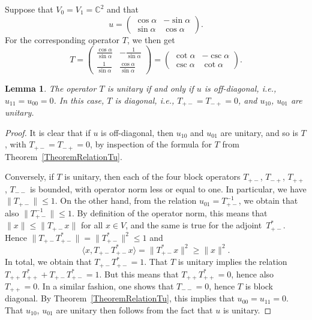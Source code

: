 \documentclass[10pt,a4paper]{amsart}
\numberwithin{equation}{section}
\newtheorem{Lemma}[Theorem]{Lemma}
\newcommand{\C}{\mathbb{C}}
\begin{document}
\begin{Example}
Suppose that $V_0 = V_1 = \C^2$ and that
\begin{equation*}
 u = \begin{pmatrix} \cos\alpha & - \sin\alpha \\ \sin\alpha & \cos\alpha \end{pmatrix}.
\end{equation*}
For the corresponding operator $T$, we then get
\begin{equation*}
 T = \begin{pmatrix} \frac{\cos\alpha}{\sin\alpha} & - \frac{1}{\sin\alpha} \\ \frac{1}{\sin\alpha} & \frac{\cos\alpha}{\sin\alpha} \end{pmatrix} = \begin{pmatrix} \cot\alpha & - \csc\alpha \\ \csc\alpha & \cot\alpha \end{pmatrix}.
\end{equation*}
\end{Example}

\begin{Lemma} \label{LemmaTunitary}
The operator $T$ is unitary if and only if $u$ is off-diagonal, i.e., $u_{11} = u_{00} = 0$.
In this case, $T$ is diagonal, i.e., $T_{+-} = T_{-+} = 0$, and $u_{10}$, $u_{01}$ are unitary.
\end{Lemma}

\begin{proof}
It is clear that if $u$ is off-diagonal, then $u_{10}$ and $u_{01}$ are unitary, and so is $T$, with $T_{+-} = T_{-+}=0$, by inspection of the formula for $T$ from Theorem~\ref{TheoremRelationTu}.

Conversely, if $T$ is unitary, then each of the four block operators $T_{+-}$, $T_{-+}$, $T_{++}$, $T_{--}$ is bounded, with operator norm less or equal to one.
In particular, we have $\|T_{+-}\| \leq 1$.
On the other hand, from the relation $u_{01} = T_{+-}^{-1}$, we obtain that also $\big\|T_{+-}^{-1}\big\| \leq 1$.
By definition of the operator norm, this means that $\|x\| \leq \|T_{+-}x\|$ for all $x \in V$, and the same is true for the adjoint~$T_{+-}^*$.
Hence $\|T_{+-}T_{+-}^*\| = \|T_{+-}^*\|^2 \leq 1$ and
\begin{equation*}
\langle x, T_{+-} T_{+-}^* x \rangle = \|T_{+-}^*x\|^2 \geq \|x\|^2.
\end{equation*}
In total, we obtain that $T_{+-} T_{+-}^* = 1$.
That $T$ is unitary implies the relation $T_{++} T_{++}^* + T_{+-} T_{+-}^* = 1$.
But this means that $T_{++} T_{++}^*= 0$, hence also $T_{++}=0$.
In a similar fashion, one shows that $T_{--} = 0$, hence $T$ is block diagonal.
By Theorem~\ref{TheoremRelationTu}, this implies that $u_{00} = u_{11} = 0$.
That $u_{10}$, $u_{01}$ are unitary then follows from the fact that $u$ is unitary.
\end{proof}
\end{document}
